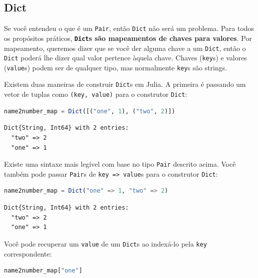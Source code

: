\documentclass[
  notoc %
]{tufte-book}
\newcommand{\passthrough}[1]{#1}
\begin{document}
\hypertarget{sec:dict}{%
\subsection{Dict}\label{sec:dict}}

Se você entendeu o que é um \passthrough{\lstinline!Pair!}, então
\passthrough{\lstinline!Dict!} não será um problema. Para todos os
propósitos práticos, \textbf{\passthrough{\lstinline!Dict!}s são
mapeamentos de chaves para valores}. Por mapeamento, queremos dizer que
se você der alguma chave a um \passthrough{\lstinline!Dict!}, então o
\passthrough{\lstinline!Dict!} poderá lhe dizer qual valor pertence
àquela chave. Chaves (\passthrough{\lstinline!key!}s) e valores
(\passthrough{\lstinline!value!}s) podem ser de qualquer tipo, mas
normalmente \passthrough{\lstinline!key!}s são strings.

Existem duas maneiras de construir \passthrough{\lstinline!Dict!}s em
Julia. A primeira é passando um vetor de tuplas como
\passthrough{\lstinline!(key, value)!} para o construtor
\passthrough{\lstinline!Dict!}:

\begin{lstlisting}[language=Julia]
name2number_map = Dict([("one", 1), ("two", 2)])
\end{lstlisting}

\begin{lstlisting}[language=Output]
Dict{String, Int64} with 2 entries:
  "two" => 2
  "one" => 1
\end{lstlisting}

Existe uma sintaxe mais legível com base no tipo
\passthrough{\lstinline!Pair!} descrito acima. Você também pode passar
\passthrough{\lstinline!Pair!}s de
\passthrough{\lstinline!key => value!}s para o construtor
\passthrough{\lstinline!Dict!}:

\begin{lstlisting}[language=Julia]
name2number_map = Dict("one" => 1, "two" => 2)
\end{lstlisting}

\begin{lstlisting}[language=Output]
Dict{String, Int64} with 2 entries:
  "two" => 2
  "one" => 1
\end{lstlisting}

Você pode recuperar um \passthrough{\lstinline!value!} de um
\passthrough{\lstinline!Dict!}s ao indexá-lo pela
\passthrough{\lstinline!key!} correspondente:

\begin{lstlisting}[language=Julia]
name2number_map["one"]
\end{lstlisting}
\end{document}
